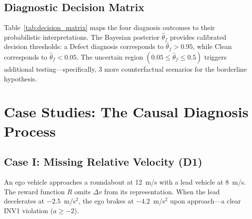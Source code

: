 \documentclass[journal]{IEEEtran}
\theoremstyle{plain}
\begin{document}
\FloatBarrier

\subsection{Diagnostic Decision Matrix}

Table~\ref{tab:decision_matrix} maps the four diagnosis outcomes to their probabilistic interpretations. The Bayesian posterior $\hat{\theta}_f$ provides calibrated decision thresholds: a Defect diagnosis corresponds to $\hat{\theta}_f > 0.95$, while Clean corresponds to $\hat{\theta}_f < 0.05$. The uncertain region $(0.05 \leq \hat{\theta}_f \leq 0.5)$ triggers additional testing---specifically, 3 more counterfactual scenarios for the borderline hypothesis.

\begin{table}[t]
\centering\footnotesize
{}
\caption{Diagnosis Decision Logic with Probabilistic Interpretation}
\label{tab:decision_matrix}
\end{table}

\section{Case Studies: The Causal Diagnosis Process}

\subsection{Case I: Missing Relative Velocity (D1)}

An ego vehicle approaches a roundabout at 12~m/s with a lead vehicle at 8~m/s. The reward function $R$ omits $\Delta v$ from its representation. When the lead decelerates at $-2.5$~m/s$^2$, the ego brakes at $-4.2$~m/s$^2$ upon approach---a clear INV1 violation ($a \geq -2$).
\end{document}
